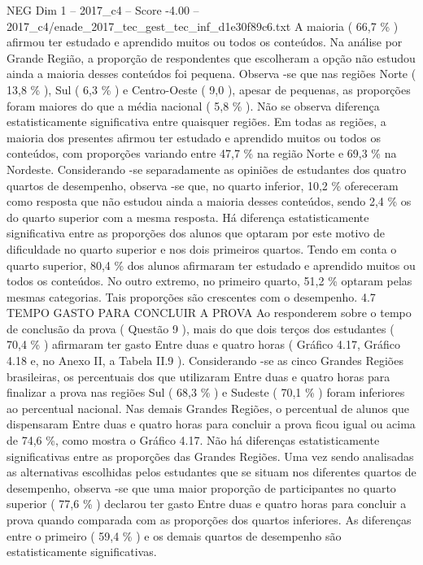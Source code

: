 \begin{textsample}{NEG Dim 1 – 2017\_c4 – Score -4.00 – 2017\_c4/enade\_2017\_tec\_gest\_tec\_inf\_d1e30f89c6.txt}
A maioria ( 66,7 \% ) afirmou ter estudado e aprendido muitos ou todos os conteúdos.
Na análise por Grande Região, a proporção de respondentes que escolheram a opção não estudou ainda a maioria desses conteúdos foi pequena.
Observa -se que nas regiões Norte ( 13,8 \% ), Sul ( 6,3 \% ) e Centro-Oeste ( 9,0 ), apesar de pequenas, as proporções foram maiores do que a média nacional ( 5,8 \% ).
Não se observa diferença estatisticamente significativa entre quaisquer regiões.
Em todas as regiões, a maioria dos presentes afirmou ter estudado e aprendido muitos ou todos os conteúdos, com proporções variando entre 47,7 \% na região Norte e 69,3 \% na Nordeste.
Considerando -se separadamente as opiniões de estudantes dos quatro quartos de desempenho, observa -se que, no quarto inferior, 10,2 \% ofereceram como resposta que não estudou ainda a maioria desses conteúdos, sendo 2,4 \% os do quarto superior com a mesma resposta.
Há diferença estatisticamente significativa entre as proporções dos alunos que optaram por este motivo de dificuldade no quarto superior e nos dois primeiros quartos.
Tendo em conta o quarto superior, 80,4 \% dos alunos afirmaram ter estudado e aprendido muitos ou todos os conteúdos.
No outro extremo, no primeiro quarto, 51,2 \% optaram pelas mesmas categorias.
Tais proporções são crescentes com o desempenho. 4.7 TEMPO GASTO PARA CONCLUIR A PROVA Ao responderem sobre o tempo de conclusão da prova ( Questão 9 ), mais do que dois terços dos estudantes ( 70,4 \% ) afirmaram ter gasto Entre duas e quatro horas ( Gráfico 4.17, Gráfico 4.18 e, no Anexo II, a Tabela II.9 ).
Considerando -se as cinco Grandes Regiões brasileiras, os percentuais dos que utilizaram Entre duas e quatro horas para finalizar a prova nas regiões Sul ( 68,3 \% ) e Sudeste ( 70,1 \% ) foram inferiores ao percentual nacional.
Nas demais Grandes Regiões, o percentual de alunos que dispensaram Entre duas e quatro horas para concluir a prova ficou igual ou acima de 74,6 \%, como mostra o Gráfico 4.17.
Não há diferenças estatisticamente significativas entre as proporções das Grandes Regiões.
Uma vez sendo analisadas as alternativas escolhidas pelos estudantes que se situam nos diferentes quartos de desempenho, observa -se que uma maior proporção de participantes no quarto superior ( 77,6 \% ) declarou ter gasto Entre duas e quatro horas para concluir a prova quando comparada com as proporções dos quartos inferiores.
As diferenças entre o primeiro ( 59,4 \% ) e os demais quartos de desempenho são estatisticamente significativas.

\end{textsample}
